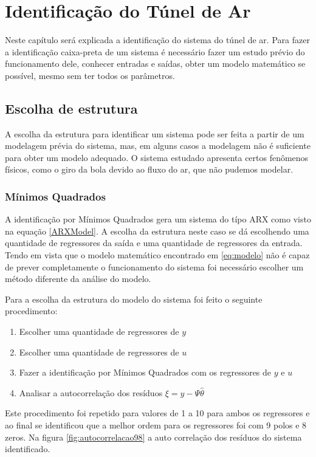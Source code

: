 \chapter{Identificação do Túnel de Ar} \label{cap4}
Neste capítulo será explicada a identificação do sistema do túnel de ar. Para fazer a identificação caixa-preta de um sistema é necessário fazer um estudo prévio do funcionamento dele, conhecer entradas e saídas, obter um modelo matemático se possível, mesmo sem ter todos os parâmetros.
\section{Escolha de estrutura}
A escolha da estrutura para identificar um sistema pode ser feita a partir de um modelagem prévia do sistema, mas, em alguns casos a modelagem não é suficiente para obter um modelo adequado. O sistema estudado apresenta certos fenômenos físicos, como o giro da bola devido ao fluxo do ar, que não pudemos modelar.
\subsection{Mínimos Quadrados}\label{s:4mq}
A identificação por Mínimos Quadrados gera um sistema do típo ARX como visto na equação \ref{ARXModel}. A escolha da estrutura neste caso se dá escolhendo uma quantidade de regressores da saída e uma quantidade de regressores da entrada. Tendo em vista que o modelo matemático encontrado em \ref{eq:modelo} não é capaz de prever completamente o funcionamento do sistema foi necessário escolher um método diferente da análise do modelo.


Para a escolha da estrutura do modelo do sistema foi feito o seguinte procedimento:
\begin{enumerate}
	\item Escolher uma quantidade de regressores de $y$
	\item Escolher uma quantidade de regressores de $u$
	\item Fazer a identificação por Mínimos Quadrados com os regressores de $y$ e $u$
	\item Analisar a autocorrelação dos resíduos $\xi=y-\Psi \hat{\theta}$
\end{enumerate}

Este procedimento foi repetido para valores de 1 a 10 para ambos os regressores e ao final se identificou que a melhor ordem para os regressores foi com 9 polos e 8 zeros. Na figura \ref{fig:autocorrelacao98} a auto correlação dos resíduos do sistema identificado.

